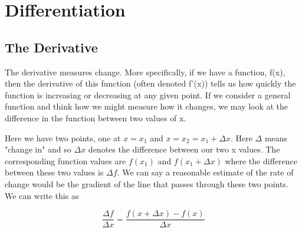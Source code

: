 \chapter{Differentiation}
\section{The Derivative}

The derivative measures change. More specifically, if we have a function, f(x), then the derivative
of this function (often denoted f'(x)) tells us how quickly the function is increasing or decreasing
at any given point. If we consider a general function and think how we might measure how it changes,
we may look at the difference in the function between two values of x.

\begin{center}
\end{center}

Here we have two points, one at $x = x_1$ and $x = x_2 = x_1 + \Delta x$. Here $\Delta$ means "change in"
and so $\Delta x$ denotes the difference between our two x values. The corresponding function values are
$f(x_1)$ and $f(x_1 + \Delta x)$ where the difference between these two values is $\Delta f$. We can say 
a reasonable estimate of the rate of change would be the gradient of the line that passes through these two 
points. We can write this as

\begin{equation*}
    \frac{\Delta f}{\Delta x} = \frac{f(x + \Delta x) - f(x)}{\Delta x}
\end{equation*}

